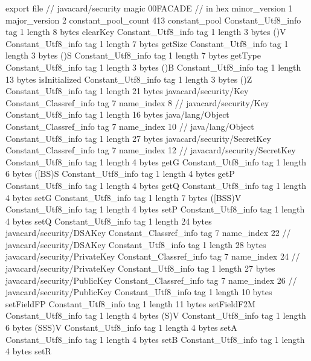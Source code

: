 export file {		// javacard/security
	magic	00FACADE		 // in hex
	minor_version	1
	major_version	2
	constant_pool_count	413
	constant_pool {
		Constant_Utf8_info {
			tag	1
			length	8
			bytes	clearKey
		}
		Constant_Utf8_info {
			tag	1
			length	3
			bytes	()V
		}
		Constant_Utf8_info {
			tag	1
			length	7
			bytes	getSize
		}
		Constant_Utf8_info {
			tag	1
			length	3
			bytes	()S
		}
		Constant_Utf8_info {
			tag	1
			length	7
			bytes	getType
		}
		Constant_Utf8_info {
			tag	1
			length	3
			bytes	()B
		}
		Constant_Utf8_info {
			tag	1
			length	13
			bytes	isInitialized
		}
		Constant_Utf8_info {
			tag	1
			length	3
			bytes	()Z
		}
		Constant_Utf8_info {
			tag	1
			length	21
			bytes	javacard/security/Key
		}
		Constant_Classref_info {
			tag	7
			name_index	8		// javacard/security/Key
		}
		Constant_Utf8_info {
			tag	1
			length	16
			bytes	java/lang/Object
		}
		Constant_Classref_info {
			tag	7
			name_index	10		// java/lang/Object
		}
		Constant_Utf8_info {
			tag	1
			length	27
			bytes	javacard/security/SecretKey
		}
		Constant_Classref_info {
			tag	7
			name_index	12		// javacard/security/SecretKey
		}
		Constant_Utf8_info {
			tag	1
			length	4
			bytes	getG
		}
		Constant_Utf8_info {
			tag	1
			length	6
			bytes	([BS)S
		}
		Constant_Utf8_info {
			tag	1
			length	4
			bytes	getP
		}
		Constant_Utf8_info {
			tag	1
			length	4
			bytes	getQ
		}
		Constant_Utf8_info {
			tag	1
			length	4
			bytes	setG
		}
		Constant_Utf8_info {
			tag	1
			length	7
			bytes	([BSS)V
		}
		Constant_Utf8_info {
			tag	1
			length	4
			bytes	setP
		}
		Constant_Utf8_info {
			tag	1
			length	4
			bytes	setQ
		}
		Constant_Utf8_info {
			tag	1
			length	24
			bytes	javacard/security/DSAKey
		}
		Constant_Classref_info {
			tag	7
			name_index	22		// javacard/security/DSAKey
		}
		Constant_Utf8_info {
			tag	1
			length	28
			bytes	javacard/security/PrivateKey
		}
		Constant_Classref_info {
			tag	7
			name_index	24		// javacard/security/PrivateKey
		}
		Constant_Utf8_info {
			tag	1
			length	27
			bytes	javacard/security/PublicKey
		}
		Constant_Classref_info {
			tag	7
			name_index	26		// javacard/security/PublicKey
		}
		Constant_Utf8_info {
			tag	1
			length	10
			bytes	setFieldFP
		}
		Constant_Utf8_info {
			tag	1
			length	11
			bytes	setFieldF2M
		}
		Constant_Utf8_info {
			tag	1
			length	4
			bytes	(S)V
		}
		Constant_Utf8_info {
			tag	1
			length	6
			bytes	(SSS)V
		}
		Constant_Utf8_info {
			tag	1
			length	4
			bytes	setA
		}
		Constant_Utf8_info {
			tag	1
			length	4
			bytes	setB
		}
		Constant_Utf8_info {
			tag	1
			length	4
			bytes	setR
}}}
